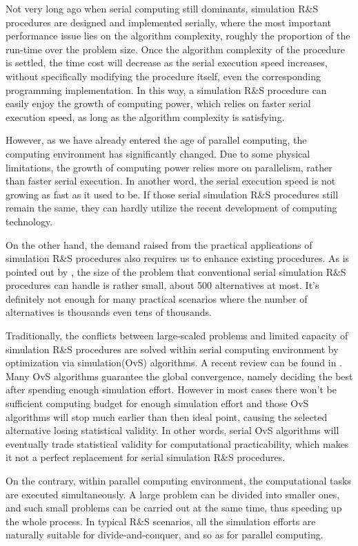 \documentclass[12pt,a4paper]{report}
\begin{document}
Not very long ago when serial computing still dominants, simulation R\&S procedures are designed and implemented serially, where the most important performance issue lies on the algorithm complexity, roughly the proportion of the run-time over the problem size. Once the algorithm complexity of the procedure is settled, the time cost will decrease as the serial execution speed increases, without specifically modifying the procedure itself, even the corresponding programming implementation. In this way, a simulation R\&S procedure can easily enjoy the growth of computing power, which relies on faster serial execution speed, as long as the algorithm complexity is satisfying.

However, as we have already entered the age of parallel computing, the computing environment has significantly changed. Due to some physical limitations, the growth of computing power relies more on parallelism, rather than faster serial execution. In another word, the serial execution speed is not growing as fast as it used to be. If those serial simulation R\&S procedures still remain the same, they can hardly utilize the recent development of computing technology.

On the other hand, the demand raised from the practical applications of simulation R\&S procedures also requires us to enhance existing procedures. As is pointed out by \cite{ehiorams06ras}, the size of the problem that conventional serial simulation R\&S procedures can handle is rather small, about 500 alternatives at most. It's definitely not enough for many practical scenarios where the number of alternatives is thousands even tens of thousands. 

Traditionally, the conflicts between large-scaled problems and limited capacity of simulation R\&S procedures are solved within serial computing environment by optimization via simulation(OvS) algorithms. A recent review can be found in \cite{potwsc09ovs}. Many OvS algorithms guarantee the global convergence, namely deciding the best after spending enough simulation effort. However in most cases there won't be sufficient computing budget for enough simulation effort and those OvS algorithms will stop much earlier than then ideal point, causing the selected alternative losing statistical validity. In other words, serial OvS algorithms will eventually trade statistical validity for computational practicability, which makes it not a perfect replacement for serial simulation R\&S procedures.

On the contrary, within parallel computing environment, the computational tasks are executed simultaneously. A large problem can be divided into smaller ones, and such small problems can be carried out at the same time, thus speeding up the whole process. In typical R\&S scenarios, all the simulation efforts are naturally suitable for divide-and-conquer, and so as for parallel computing.
\end{document}
